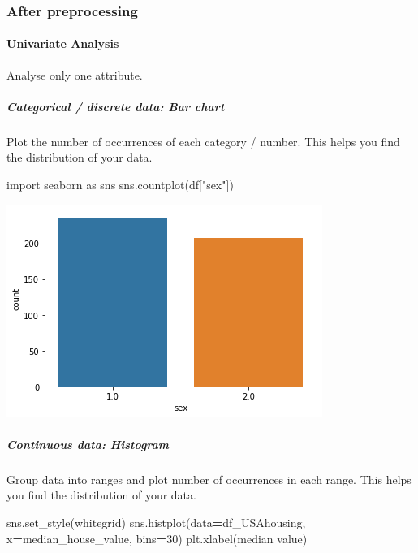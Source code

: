 \documentclass[
]{book}
\newenvironment{Shaded}{\begin{snugshade}}{\end{snugshade}}
\newcommand{\DecValTok}[1]{\textcolor[rgb]{0.00,0.00,0.81}{#1}}
\newcommand{\ImportTok}[1]{#1}
\newcommand{\NormalTok}[1]{#1}
\newcommand{\OperatorTok}[1]{\textcolor[rgb]{0.81,0.36,0.00}{\textbf{#1}}}
\newcommand{\StringTok}[1]{\textcolor[rgb]{0.31,0.60,0.02}{#1}}
\begin{document}
\hypertarget{after-preprocessing}{%
\subsubsection{After preprocessing}\label{after-preprocessing}}

\hypertarget{univariate-analysis}{%
\paragraph{Univariate Analysis}\label{univariate-analysis}}

Analyse only one attribute.

\hypertarget{categorical-discrete-data-bar-chart}{%
\subparagraph{Categorical / discrete data: Bar chart}\label{categorical-discrete-data-bar-chart}}

Plot the number of occurrences of each category / number. This helps you
find the distribution of your data.

\begin{Shaded}
\begin{Highlighting}[]
\ImportTok{import}\NormalTok{ seaborn }\ImportTok{as}\NormalTok{ sns}
\NormalTok{sns.countplot(df[}\StringTok{"sex"}\NormalTok{])}
\end{Highlighting}
\end{Shaded}

\includegraphics{figures/countplot.png}

\hypertarget{continuous-data-histogram}{%
\subparagraph{Continuous data: Histogram}\label{continuous-data-histogram}}

Group data into ranges and plot number of occurrences in each range.
This helps you find the distribution of your data.

\begin{Shaded}
\begin{Highlighting}[]
\NormalTok{sns.set\_style(}\StringTok{\textquotesingle{}whitegrid\textquotesingle{}}\NormalTok{)}
\NormalTok{sns.histplot(data}\OperatorTok{=}\NormalTok{df\_USAhousing, x}\OperatorTok{=}\StringTok{\textquotesingle{}median\_house\_value\textquotesingle{}}\NormalTok{, bins}\OperatorTok{=}\DecValTok{30}\NormalTok{)}
\NormalTok{plt.xlabel(}\StringTok{\textquotesingle{}median value\textquotesingle{}}\NormalTok{)}
\end{Highlighting}
\end{Shaded}
\end{document}

